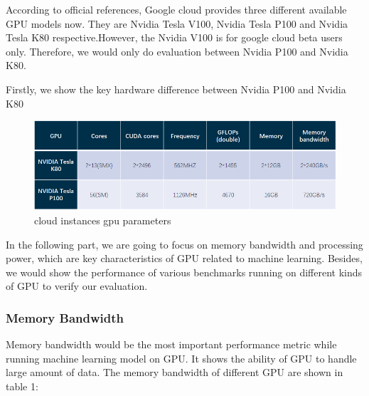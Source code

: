 \documentclass[conference]{IEEEtran}
\begin{document}
According to official references, Google cloud provides three different available GPU models now. They are Nvidia Tesla V100, Nvidia Tesla P100 and Nvidia Tesla K80 respective.However, the Nvidia V100 is for google cloud beta users only. Therefore, we would only do evaluation between Nvidia P100 and Nvidia K80.




Firstly, we show the key hardware difference between Nvidia P100 and Nvidia K80 

\begin{figure}[H]
\centering
  \begin{minipage}{.4\textwidth}
    \centering
    \includegraphics[width=1.0\linewidth]{hardware_parameter.jpg}
    \caption{cloud instances gpu parameters}
    \label{fig:fig_1}
  \end{minipage}
\end{figure}

In the following part, we are going to focus on memory bandwidth and processing power, which are key characteristics of GPU related to machine learning. Besides, we would show the performance of various benchmarks running on different kinds of GPU to verify our evaluation. 

\subsubsection{Memory Bandwidth}
Memory bandwidth would be the most important performance metric while running machine learning model on GPU. It shows the ability of GPU to handle large amount of data. The memory bandwidth of different GPU are shown in table 1:
\end{document}
